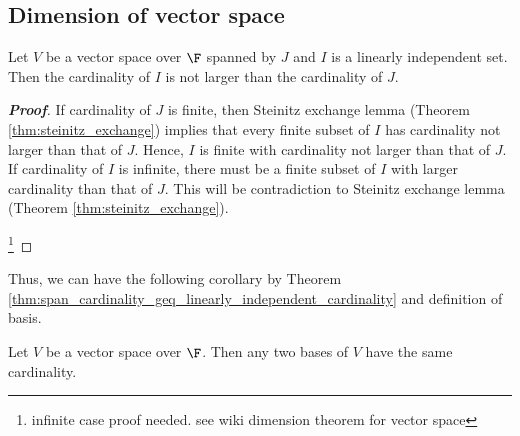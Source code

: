 \subsection{Dimension of vector space}




\begin{theorem}\label{thm:span_cardinality_geq_linearly_independent_cardinality}
Let $V$ be a vector space over $\F$ spanned by $J$ and $I$ is a linearly independent set. Then the cardinality of $I$ is not larger than the cardinality of $J$.
\end{theorem}

\begin{proof}[\bf Proof]
If cardinality of $J$ is finite, then Steinitz exchange lemma (Theorem \ref{thm:steinitz_exchange}) implies that every finite subset of $I$ has cardinality not larger than that of $J$. Hence, $I$ is finite with cardinality not larger than that of $J$. If cardinality of $I$ is infinite, there must be a finite subset of $I$ with larger cardinality than that of $J$. This will be contradiction to Steinitz exchange lemma (Theorem \ref{thm:steinitz_exchange}).

\footnote{infinite case proof needed. see wiki dimension theorem for vector space}
\end{proof}

Thus, we can have the following corollary by Theorem \ref{thm:span_cardinality_geq_linearly_independent_cardinality} and definition of basis.

\begin{corollary}\label{cor:dimension_theorem_for_vector_space}
Let $V$ be a vector space over $\F$. Then any two bases of $V$ have the same cardinality.
\end{corollary}


